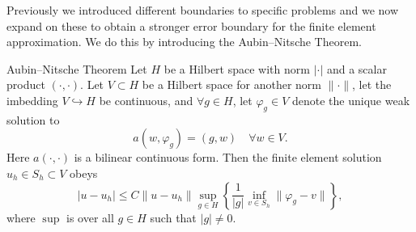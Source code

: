 Previously we introduced different boundaries to specific problems and we now expand on these to obtain a stronger error boundary for the finite element approximation. 
We do this by introducing the Aubin–Nitsche Theorem.
\begin{thmx}{Aubin–Nitsche Theorem\label{thm:aubin-nitsche}}
    Let $H$ be a Hilbert space with norm $|\cdot|$ and a scalar product $(\cdot,\cdot)$.
    Let $V\subset H$ be a Hilbert space for another norm $\|\cdot\|$, let the imbedding
    $V \hookrightarrow H$ be continuous,
    and $\forall g \in H$, let $\varphi_g \in V$ denote the unique weak solution to 
    \begin{equation}
        a(w,\varphi_g) = (g,w) \quad \forall w\in V. \label{eq:aubin_nitsche_antagelse}
    \end{equation}
    Here $a(\cdot,\cdot)$ is a bilinear continuous form.
    Then the finite element solution $u_h\in S_h \subset V$ obeys
    \begin{equation*}
        |u-u_h| \leq C \|u-u_h\| \sup_{g\in H} \left \{ \frac{1}{|g|} \inf_{v \in S_h} \|\varphi_g - v\| \right \},
    \end{equation*}
    where $\sup$ is over all $g\in H$ such that $|g|\neq 0$.
\end{thmx}
